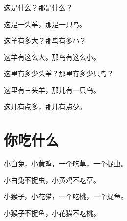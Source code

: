 \documentclass[12pt,UTF-8,openany]{ctexbook}
\begin{document}
\begin{large}
    
    这是什么？那是什么？
    
    这是一头羊，那是一只鸟。
    
    这羊有多大？那鸟有多小？
    
    这羊有这么大。那鸟有这么小。
    
    这里有多少头羊？那里有多少只鸟？
    
    这里有三头羊，那儿有一只鸟。
    
    这儿有点多，那儿有点少。
    
\end{large}


\clearpage

\begin{center}
    
\end{center}


\hanzibox{}\hanzibox{}\hanzibox{}\hanzibox{}\hspace{1em}\hanzibox{}\hanzibox{}\hanzibox{}\hanzibox{}

\hanzibox{}\hanzibox{}\hanzibox{}\hanzibox{}\hspace{1em}\hanzibox{}\hanzibox{}\hanzibox{}\hanzibox{}

\hanzibox{}\hanzibox{}\hanzibox{}\hanzibox{}\hspace{1em}\hanzibox{}\hanzibox{}\hanzibox{}\hanzibox{}

\hanzibox{}\hanzibox{}\hanzibox{}\hanzibox{}\hspace{1em}\hanzibox{}\hanzibox{}\hanzibox{}\hanzibox{}






\chapter{你吃什么}

\begin{large}
    
    小白兔，小黄鸡，一个吃草，一个捉虫。
    
    小白兔不捉虫，小黄鸡不吃草。
    
    小猴子，小花猫，一个吃桃，一个捉鱼。
    
    小猴子不捉鱼，小花猫不吃桃。
    
\end{large}
\end{document}
